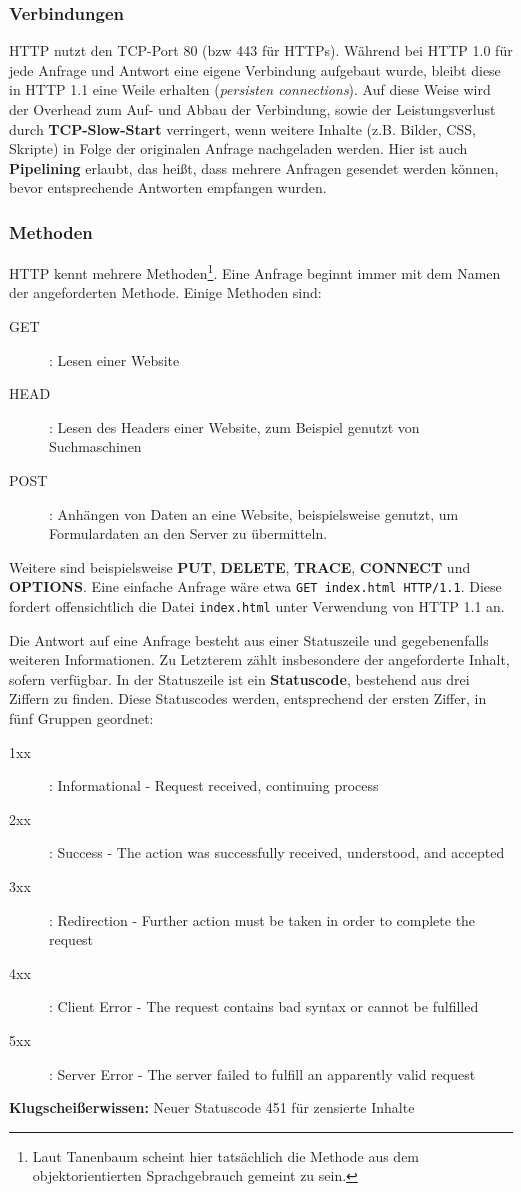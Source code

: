 \documentclass{article} %
\begin{document}
\subsubsection{Verbindungen}

HTTP nutzt den TCP-Port 80 (bzw 443 für HTTPs).
Während bei HTTP 1.0 für jede Anfrage und Antwort eine eigene Verbindung aufgebaut wurde, bleibt diese in HTTP 1.1 eine Weile erhalten (\emph{persisten connections}).
Auf diese Weise wird der Overhead zum Auf- und Abbau der Verbindung, sowie der Leistungsverlust durch \textbf{TCP-Slow-Start} verringert, wenn weitere Inhalte (z.B. Bilder, CSS, Skripte) in Folge der originalen Anfrage nachgeladen werden.
Hier ist auch \textbf{Pipelining} erlaubt, das heißt, dass mehrere Anfragen gesendet werden können, bevor entsprechende Antworten empfangen wurden.

\subsubsection{Methoden}

HTTP kennt mehrere Methoden\footnote{Laut Tanenbaum\cite{tanenbaum2003computer} scheint hier tatsächlich die Methode aus dem objektorientierten Sprachgebrauch gemeint zu sein.}.
Eine Anfrage beginnt immer mit dem Namen der angeforderten Methode.
Einige Methoden sind:
\begin{description}
	\item[GET]: Lesen einer Website
	\item[HEAD]: Lesen des Headers einer Website, zum Beispiel genutzt von Suchmaschinen
	\item[POST]: Anhängen von Daten an eine Website, beispielsweise genutzt, um Formulardaten an den Server zu übermitteln.
\end{description}
Weitere sind beispielsweise \textbf{PUT}, \textbf{DELETE}, \textbf{TRACE}, \textbf{CONNECT} und \textbf{OPTIONS}.
Eine einfache Anfrage wäre etwa \texttt{GET index.html HTTP/1.1}.
Diese fordert offensichtlich die Datei \texttt{index.html} unter Verwendung von HTTP 1.1 an.

Die Antwort auf eine Anfrage besteht aus einer Statuszeile und gegebenenfalls weiteren Informationen.
Zu Letzterem zählt insbesondere der angeforderte Inhalt, sofern verfügbar.
In der Statuszeile ist ein \textbf{Statuscode}, bestehend aus drei Ziffern zu finden.
Diese Statuscodes werden, entsprechend der ersten Ziffer, in fünf Gruppen geordnet:
\begin{description}
	\item[1xx]: Informational - Request received, continuing process
	\item[2xx]: Success - The action was successfully received, understood, and accepted
	\item[3xx]: Redirection - Further action must be taken in order to complete the request
	\item[4xx]: Client Error - The request contains bad syntax or cannot be fulfilled
	\item[5xx]: Server Error - The server failed to fulfill an apparently valid request
\end{description}
\textbf{Klugscheißerwissen:} Neuer Statuscode 451 für zensierte Inhalte\cite{http451rfcDraft, sokolov2015http451}
\end{document}
